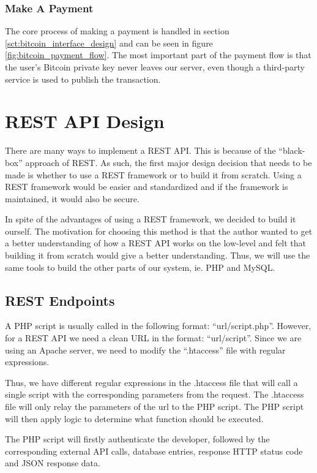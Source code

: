 \subsubsection{Make A Payment}

The core process of making a payment is handled in section \ref{sct:bitcoin_interface_design} and can be seen in figure \ref{fig:bitcoin_payment_flow}. The most important part of the payment flow is that the user's Bitcoin private key never leaves our server, even though a third-party service is used to publish the transaction. 


\section{REST API Design}

There are many ways to implement a REST API. This is because of the ``black-box'' approach of REST. As such, the first major design decision that needs to be made is whether to use a REST framework or to build it from scratch. Using a REST framework would be easier and standardized and if the framework is maintained, it would also be secure.

In spite of the advantages of using a REST framework, we decided to build it ourself. The motivation for choosing this method is that the author wanted to get a better understanding of how a REST API works on the low-level and felt that building it from scratch would give a better understanding. Thus, we will use the same tools to build the other parts of our system, ie. PHP and MySQL.

\subsection{REST Endpoints}

A PHP script is usually called in the following format: ``url/script.php''. However, for a REST API we need a clean URL in the format: ``url/script''. Since we are using an Apache server, we need to modify the ``.htaccess'' file with regular expressions.

Thus, we have different regular expressions in the .htaccess file that will call a single script with the corresponding parameters from the request. The .htaccess file will only relay the parameters of the url to the PHP script. The PHP script will then apply logic to determine what function should be executed. 

The PHP script will firstly authenticate the developer, followed by the corresponding external API calls, database entries, response HTTP status code and JSON response data.

